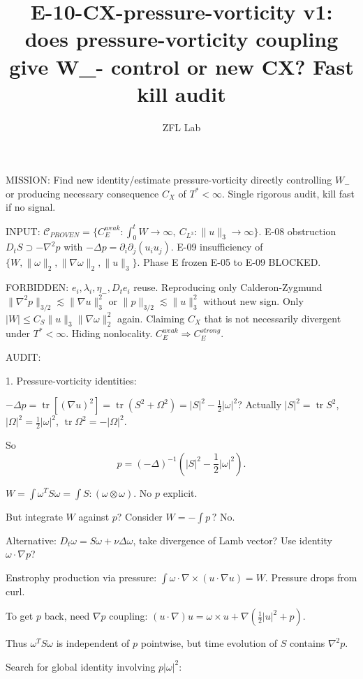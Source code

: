 \documentclass[11pt]{article}
\title{E-10-CX-pressure-vorticity v1: does pressure-vorticity coupling give W\_- control or new CX? Fast kill audit}
\author{ZFL Lab}
\begin{document}
\maketitle

MISSION: Find new identity/estimate pressure-vorticity directly controlling $W_-$ or producing necessary consequence $C_X$ of $T^*<\infty$. Single rigorous audit, kill fast if no signal.

INPUT: $\mathcal{C}_{PROVEN}=\{C_E^{weak}: \int_0^t W\to\infty,\ C_{L^3}: \|u\|_3\to\infty\}$. E-08 obstruction $D_t S\supset -\nabla^2 p$ with $-\Delta p=\partial_i\partial_j(u_i u_j)$. E-09 insufficiency of $\{W,\|\omega\|_2,\|\nabla\omega\|_2,\|u\|_3\}$. Phase E frozen E-05 to E-09 BLOCKED.

FORBIDDEN:
$e_i,\lambda_i,\eta_-,D_t e_i$ reuse.
Reproducing only Calderon-Zygmund $\|\nabla^2 p\|_{3/2}\lesssim\|\nabla u\|_3^2$ or $\|p\|_{3/2}\lesssim\|u\|_3^2$ without new sign.
Only $|W|\le C_S\|u\|_3\|\nabla\omega\|_2^2$ again.
Claiming $C_X$ that is not necessarily divergent under $T^*<\infty$.
Hiding nonlocality.
$C_E^{weak}\Rightarrow C_E^{strong}$.

AUDIT:

1. Pressure-vorticity identities:

$-\Delta p = \operatorname{tr}[(\nabla u)^2] = \operatorname{tr}(S^2+\Omega^2) = |S|^2-\frac12|\omega|^2$? Actually $|S|^2=\operatorname{tr}S^2$, $|\Omega|^2=\frac12|\omega|^2$, $\operatorname{tr}\Omega^2=-|\Omega|^2$.

So
\begin{equation*}
p = (-\Delta)^{-1}\left(|S|^2-\frac12|\omega|^2\right).
\end{equation*}

$W=\int\omega^T S\omega = \int S:(\omega\otimes\omega)$. No $p$ explicit.

But integrate $W$ against $p$? Consider $W = -\int p\,? $ No.

Alternative: $D_t\omega = S\omega+\nu\Delta\omega$, take divergence of Lamb vector? Use identity $\omega\cdot\nabla p$?

Enstrophy production via pressure: $\int \omega\cdot\nabla\times(u\cdot\nabla u) = W$. Pressure drops from curl.

To get $p$ back, need $\nabla p$ coupling: $(u\cdot\nabla)u = \omega\times u +\nabla(\frac12|u|^2+p)$.

Thus $\omega^T S\omega$ is independent of $p$ pointwise, but time evolution of $S$ contains $\nabla^2 p$.

Search for global identity involving $p|\omega|^2$:
\end{document}
